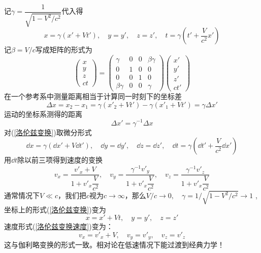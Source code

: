 \documentclass[12pt]{report}
\begin{document}
记$\gamma =\dfrac{1}{\sqrt{1-{V^2}/{c^2}}}$代入得
\begin{equation}
    x=\gamma (x'+V{t'}),\quad y=y',\quad z=z',\quad t=\gamma ({t'}+\dfrac{V}{c^2}{x'})
    \label{洛伦兹变换}
\end{equation}
记$\beta =V/c$写成矩阵的形式为
\begin{equation}
    \left(
        \begin{array}{c}
            x\\y\\z\\ct
        \end{array}
    \right)
    =
    \left(
        \begin{array}{cccc}
            \gamma &0&0& \beta \gamma\\
            0&1&0&0\\
            0&0&1&0\\
            \beta \gamma&0&0&\gamma
        \end{array}
    \right)
    \left(
        \begin{array}{c}
            x'\\y'\\z'\\ct'
        \end{array}
    \right)
\end{equation}
在一个参考系中测量距离相当于计算同一时刻下的坐标差
$$\Delta x=x_2-x_1=\gamma ({x'}_2+Vt')-\gamma({x'}_1+Vt')=\gamma \Delta {x'}$$
运动的坐标系测得的距离
\begin{equation}
    \Delta {x'}=\gamma ^{-1} \Delta x
\end{equation}
对(\ref{洛伦兹变换})取微分形式
\begin{equation*}
    \dd x=\gamma (\dd x'+V \dd {t'}),\quad \dd y=\dd y',\quad \dd z=\dd z',\quad \dd t=\gamma (\dd {t'}+\dfrac{V}{c^2} \dd {x'})
    \label{洛伦兹变换微分}
\end{equation*}
用$\dd t$除以前三项得到速度的变换
\begin{equation}
    v_x=\frac{{v'}_x+V}{1+{v'}_x\dfrac{V}{c^2}},\quad v_y=\frac{\gamma ^{-1} {v'}_y}{1+{v'}_x\dfrac{V}{c^2}},\quad v_z=\frac{\gamma ^{-1} {v'}_z}{1+{v'}_x\dfrac{V}{c^2}}
    \label{洛伦兹变换速度}
\end{equation}
通常情况下$V\ll c$，我们把$c$视为$c\rightarrow \infty $，那么$V/c\rightarrow 0,\quad \gamma =1/{\sqrt{1-{V^2}/{c^2}}}\rightarrow 1$
,坐标上的形式(\ref{洛伦兹变换})变为
\begin{equation*}
    x={x'}+V t,\quad y={y'},\quad z={z'}
\end{equation*}
速度形式(\ref{洛伦兹变换速度})变为：
\begin{equation*}
    v_x={v'}_x+V,\quad v_y={v'}_y,\quad v_z={v'}_z
\end{equation*}
这与伽利略变换的形式一致。相对论在低速情况下能过渡到经典力学！
\end{document}
